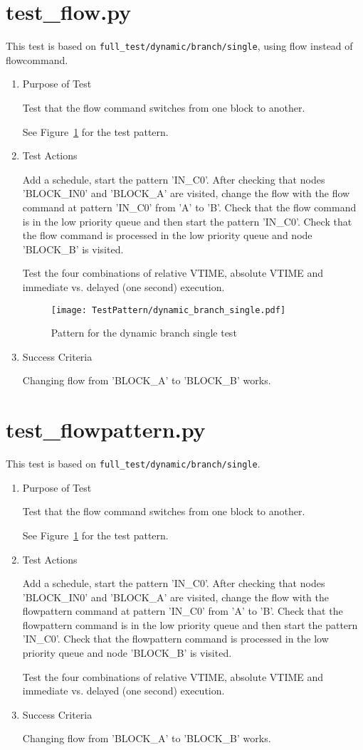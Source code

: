 \documentclass[12pt,a4paper]{report}
\begin{document}
\section{test\_flow.py}
This test is based on \texttt{full\_test/dynamic/branch/single}, using flow instead of flowcommand.
\begin{enumerate}
  \item Purpose of Test

  Test that the flow command switches from one block to another.

  See Figure~\ref{fig:Pattern_for_the_dynamic_branch_single_test} for the test pattern.
  \item Test Actions

  Add a schedule, start the pattern 'IN\_C0'. After checking that nodes 'BLOCK\_IN0' and 'BLOCK\_A' are visited,
        change the flow with the flow command at pattern 'IN\_C0' from 'A' to 'B'. Check that the flow
        command is in the low priority queue and then start the pattern 'IN\_C0'. Check that the flow
        command is processed in the low priority queue and node 'BLOCK\_B' is visited.

  Test the four combinations of relative VTIME, absolute VTIME and immediate vs. delayed (one second) execution.
    \begin{figure}
        \centering
        \texttt{[image: TestPattern/dynamic\_branch\_single.pdf]}
        \caption{Pattern for the dynamic branch single test}
        \label{fig:Pattern_for_the_dynamic_branch_single_test}
    \end{figure}
  \item Success Criteria

  Changing flow from 'BLOCK\_A' to 'BLOCK\_B' works.
\end{enumerate}
\section{test\_flowpattern.py}
This test is based on \texttt{full\_test/dynamic/branch/single}.
\begin{enumerate}
  \item Purpose of Test

  Test that the flow command switches from one block to another.

  See Figure~\ref{fig:Pattern_for_the_dynamic_branch_single_test} for the test pattern.
  \item Test Actions

  Add a schedule, start the pattern 'IN\_C0'. After checking that nodes 'BLOCK\_IN0' and 'BLOCK\_A' are visited,
        change the flow with the flowpattern command at pattern 'IN\_C0' from 'A' to 'B'. Check that the flowpattern
        command is in the low priority queue and then start the pattern 'IN\_C0'. Check that the flowpattern
        command is processed in the low priority queue and node 'BLOCK\_B' is visited.

  Test the four combinations of relative VTIME, absolute VTIME and immediate vs. delayed (one second) execution.
  \item Success Criteria

  Changing flow from 'BLOCK\_A' to 'BLOCK\_B' works.
\end{enumerate}
\end{document}
